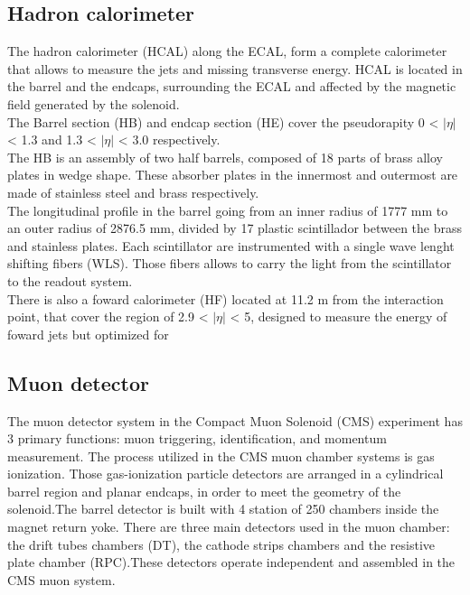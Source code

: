 \begin{linenumbers}
\subsection{Hadron calorimeter}
The hadron calorimeter (HCAL) along the ECAL, form a complete calorimeter that allows to measure the jets and missing transverse energy. HCAL is located in the barrel and the endcaps, surrounding the ECAL and affected by the magnetic field generated by the solenoid.\\
The Barrel section (HB) and endcap section (HE)  cover the pseudorapity 0 < $|\eta|$ < 1.3 and  1.3 < $|\eta|$ < 3.0 respectively.\\
The HB is an assembly of two half barrels, composed of 18 parts of brass alloy plates in wedge shape. These absorber plates in the innermost and outermost are made of stainless steel and brass respectively.\\
The longitudinal profile in the barrel going from an inner radius of 1777 mm to an outer radius of 2876.5 mm, divided by 17 plastic scintillador between the brass and stainless plates. Each scintillator are instrumented with a single wave 
lenght shifting fibers (WLS). Those fibers allows to carry the light from the scintillator to the readout system.\\


There is also a foward calorimeter (HF) located at 11.2 m from the interaction point, that cover the region of 2.9 < $|\eta|$ < 5, designed to measure the energy of foward jets but optimized for 



\subsection{Muon detector}
 The muon detector system in the Compact Muon Solenoid (CMS) experiment  has 3 primary functions: muon
triggering, identification, and momentum measurement\cite{cms7}. 
The process utilized in the CMS muon chamber systems is gas ionization. Those gas-ionization particle detectors are arranged in a cylindrical barrel region and planar endcaps, in order to meet the geometry of the solenoid.The barrel detector is built with 4 station of 250 chambers inside the magnet return yoke.\cite{cms-manual}
 There are three main detectors used in the muon chamber: the drift tubes chambers (DT), the cathode strips chambers and the resistive plate chamber (RPC).These detectors operate independent and assembled in the CMS muon system. \\
 

\end{linenumbers}
